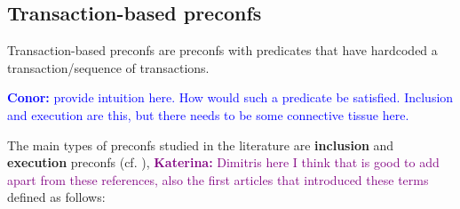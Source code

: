 \documentclass[a4paper]{article}
\theoremstyle{boldstyle}
\newcommand{\cm}[1]{\textcolor{blue}{\textbf{Conor:} #1}}
\newcommand{\ks}[1]{\textcolor{purple}{\textbf{Katerina:} #1}}
\begin{document}

    \subsection{Transaction-based preconfs}
    Transaction-based preconfs are preconfs with predicates that have hardcoded a transaction/sequence of transactions. 
    
    \cm{provide intuition here. How would such a predicate be satisfied. Inclusion and execution are this, but there needs to be some connective tissue here.} 
    
    The main types of preconfs studied in the literature are \textbf{inclusion} and \textbf{execution} preconfs (cf. \cite{W:APricingModelforInclusionPreconfirmations,W:AnalysingExpectedProposerRevenuefromPreconfirmations}), \ks{Dimitris here I think that is good to add apart from these references, also the first articles that introduced these terms} defined as follows:   
    
\end{document}
